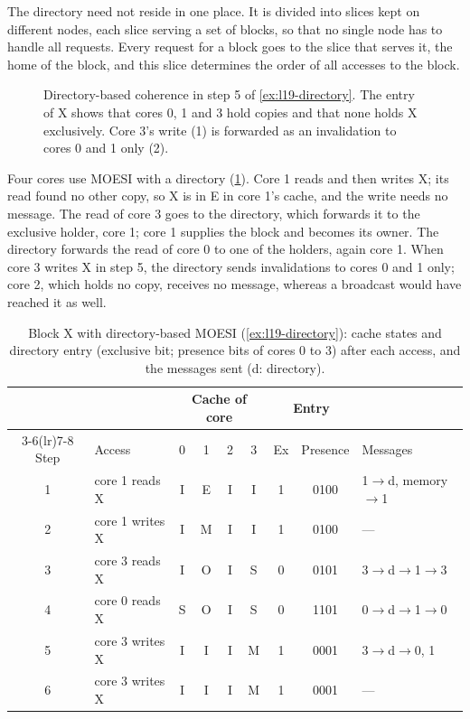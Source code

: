 \documentclass[../main.tex]{subfiles}
\begin{document}
The directory need not reside in one place.  It is divided into slices kept
on different nodes, each slice serving a set of blocks, so that no single
node has to handle all requests.  Every request for a block goes to the
slice that serves it, the home of the block, and this slice determines the
order of all accesses to the block.

\begin{figure}[htbp]
  \centering
  
  \caption{Directory-based coherence in step 5 of \cref{ex:l19-directory}.
    The entry of X shows that cores 0, 1 and 3 hold copies and that none
    holds X exclusively.  Core 3's write (1) is forwarded as an invalidation
    to cores 0 and 1 only (2).}
  \label{fig:l19-directory}
\end{figure}

\begin{example}
  \label{ex:l19-directory}
  Four cores use MOESI with a directory (\cref{tab:l19-directory}).  Core 1
  reads and then writes X; its read found no other copy, so X is in E in
  core 1's cache, and the write needs no message.  The read of core 3 goes to
  the directory, which forwards it to the exclusive holder, core 1; core 1
  supplies the block and becomes its owner.  The directory forwards the read
  of core 0 to one of the holders, again core 1.  When core 3 writes X in
  step 5, the directory sends invalidations to cores 0 and 1 only; core 2,
  which holds no copy, receives no message, whereas a broadcast would have
  reached it as well.
\end{example}

\begin{table}[htbp]
  \centering\small
  \caption{Block X with directory-based MOESI (\cref{ex:l19-directory}):
    cache states and directory entry (exclusive bit; presence bits of cores 0
    to 3) after each access, and the messages sent (d: directory).}
  \label{tab:l19-directory}
  \begin{tabular}{@{}cl cccc cc l@{}}
    \toprule
    & & \multicolumn{4}{c}{Cache of core} & \multicolumn{2}{c}{Entry} & \\
    \cmidrule(lr){3-6}\cmidrule(lr){7-8}
    Step & Access & 0 & 1 & 2 & 3 & Ex & Presence & Messages \\
    \midrule
    1 & core 1 reads X  & I & E & I & I & 1 & 0100 & 1$\to$d, memory$\to$1 \\
    2 & core 1 writes X & I & M & I & I & 1 & 0100 & --- \\
    3 & core 3 reads X  & I & O & I & S & 0 & 0101 & 3$\to$d$\to$1$\to$3 \\
    4 & core 0 reads X  & S & O & I & S & 0 & 1101 & 0$\to$d$\to$1$\to$0 \\
    5 & core 3 writes X & I & I & I & M & 1 & 0001 & 3$\to$d$\to$0, 1 \\
    6 & core 3 writes X & I & I & I & M & 1 & 0001 & --- \\
    \bottomrule
  \end{tabular}
\end{table}
\end{document}
